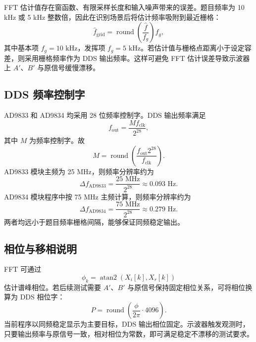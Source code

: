 \documentclass[UTF8,a4paper,zihao=-4]{ctexart}
\begin{document}
FFT 估计值存在窗函数、有限采样长度和输入噪声带来的误差。题目频率为 10 kHz 或 5 kHz 整数倍，因此在识别场景后将估计频率吸附到最近栅格：
\begin{equation}
  \hat f_{\text{grid}}=\operatorname{round}\left(\frac{\hat f}{f_g}\right)f_g,
\end{equation}
其中基本项 $f_g=10\text{ kHz}$，发挥项 $f_g=5\text{ kHz}$。若估计值与栅格点距离小于设定容差，则采用栅格频率作为 DDS 输出频率。这样可避免 FFT 估计误差导致示波器上 $A'$、$B'$ 与原信号缓慢漂移。

\subsection{DDS 频率控制字}

AD9833 和 AD9834 均采用 28 位频率控制字。DDS 输出频率满足
\begin{equation}
  f_{\text{out}}=\frac{M f_{\text{clk}}}{2^{28}},
\end{equation}
其中 $M$ 为频率控制字。故
\begin{equation}
  M=\operatorname{round}\left(\frac{f_{\text{out}}2^{28}}{f_{\text{clk}}}\right).
\end{equation}
AD9833 模块主频为 25 MHz，则频率分辨率约为
\begin{equation}
  \Delta f_{\text{AD9833}}=\frac{25\text{ MHz}}{2^{28}}\approx0.093\text{ Hz}.
\end{equation}
AD9834 模块程序中按 75 MHz 主频计算，则频率分辨率约为
\begin{equation}
  \Delta f_{\text{AD9834}}=\frac{75\text{ MHz}}{2^{28}}\approx0.279\text{ Hz}.
\end{equation}
两者均远小于题目频率栅格间隔，能够保证同频稳定输出。

\subsection{相位与移相说明}

FFT 可通过
\begin{equation}
  \phi_k=\operatorname{atan2}(X_i[k],X_r[k])
\end{equation}
估计谱峰相位。若后续测试需要 $A'$、$B'$ 与原信号保持固定相位关系，可将相位换算为 DDS 相位字：
\begin{equation}
  P=\operatorname{round}\left(\frac{\phi}{2\pi}\cdot 4096\right).
\end{equation}
当前程序以同频稳定显示为主要目标，DDS 输出相位固定。示波器触发观测时，只要输出频率与原信号一致，相对相位为常数，即可满足稳定不漂移的测试要求。
\end{document}
